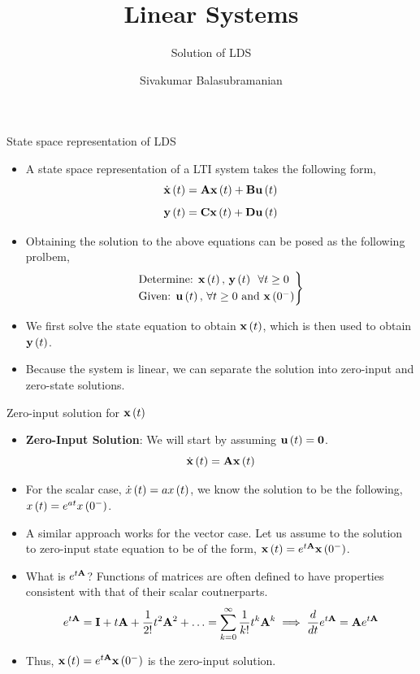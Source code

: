 \documentclass[aspectratio=169]{beamer}
\title{Linear Systems}
\subtitle{Solution of LDS}
\author{Sivakumar Balasubramanian}
\institute[Christian Medical College] %
{
  \inst{}%
  Department of Bioengineering\\
  Christian Medical College, Bagayam\\
  Vellore 632002
}
\date{}
\def\mf{\ensuremath\mathbf}
\def\lp{\ensuremath\left(}
\def\rp{\ensuremath\right)}
\newcommand{\ct}[1]{\lp #1\rp}
\begin{document}

\begin{frame}
  \titlepage
\end{frame}


\begin{frame}{State space representation of LDS}
\begin{itemize}
    \item A state space representation of a LTI system takes the following form,
    \[ \dot{\mf{x}}\ct{t} = \mf{A}\mf{x}\ct{t} + \mf{B}\mf{u}\ct{t} \]
    \[ \mf{y}\ct{t} = \mf{C}\mf{x}\ct{t} + \mf{D}\mf{u}\ct{t} \]

    \item Obtaining the solution to the above equations can be posed as the following prolbem,
    \[ \begin{rcases}
    \text{Determine:  }  \mf{x}\ct{t}, \, \mf{y}\ct{t} \,\,\, \forall t \geq 0 \\
    \text{Given:  }  \mf{u}\ct{t}, \, \forall t \geq 0 \text{ and } \mf{x}\ct{0^{-}} \\
    \end{rcases}
    \]

    \item We first solve the state equation to obtain $\mf{x}\ct{t}$, which is then used to obtain $\mf{y}\ct{t}$.

    \item Because the system is linear, we can separate the solution into zero-input and zero-state solutions.
\end{itemize}
\end{frame}


\begin{frame}{Zero-input solution for $\mf{x}\ct{t}$}
\begin{itemize}
    \item \textbf{Zero-Input Solution}: We will start by assuming $\mf{u}\ct{t} = \mf{0}$.
    \[ \dot{\mf{x}}\ct{t} = \mf{A}\mf{x}\ct{t} \]

    \item For the scalar case, $\dot{x}\ct{t} = ax\ct{t}$, we know the solution to be the following, $x\ct{t} = e^{at}x\ct{0^-}$.

    \item A similar approach works for the vector case. Let us assume to the solution to zero-input state equation to be of the form, $\mf{x}\ct{t} = e^{t\mf{A}}\mf{x}\ct{0^-}$. 

    \item What is $e^{t\mf{A}}$? Functions of matrices are often defined to have properties consistent with that of their scalar coutnerparts. 
     \[ e^{t\mf{A}} = \mf{I} + t\mf{A} + \frac{1}{2!}t^2\mf{A}^2 + \ldots = \sum_{k=0}^{\infty} \frac{1}{k!}t^k\mf{A}^k \implies \frac{d}{dt}e^{t\mf{A}} = \mf{A}e^{t\mf{A}} \]

   \item Thus, $\mf{x}\ct{t} = e^{t\mf{A}}\mf{x}\ct{0^-}$ is the zero-input solution.
\end{itemize}
\end{frame}
\end{document}
